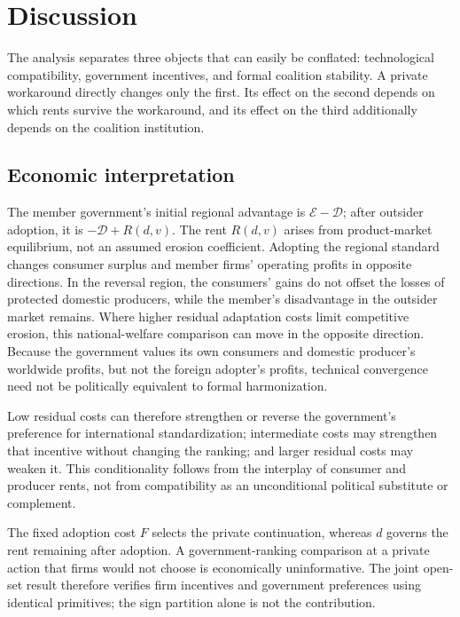\section{Discussion}
\label{sec:discussion}

The analysis separates three objects that can easily be conflated: technological compatibility, government incentives, and formal coalition stability. A private workaround directly changes only the first. Its effect on the second depends on which rents survive the workaround, and its effect on the third additionally depends on the coalition institution.

\subsection{Economic interpretation}
\label{subsec:discussion-interpretation}

The member government's initial regional advantage is $\mathscr E-\mathscr D$; after outsider adoption, it is $-\mathscr D+R(d,v)$. The rent $R(d,v)$ arises from product-market equilibrium, not an assumed erosion coefficient. Adopting the regional standard changes consumer surplus and member firms' operating profits in opposite directions. In the reversal region, the consumers' gains do not offset the losses of protected domestic producers, while the member's disadvantage in the outsider market remains. Where higher residual adaptation costs limit competitive erosion, this national-welfare comparison can move in the opposite direction. Because the government values its own consumers and domestic producer's worldwide profits, but not the foreign adopter's profits, technical convergence need not be politically equivalent to formal harmonization.

Low residual costs can therefore strengthen or reverse the government's preference for international standardization; intermediate costs may strengthen that incentive without changing the ranking; and larger residual costs may weaken it. This conditionality follows from the interplay of consumer and producer rents, not from compatibility as an unconditional political substitute or complement.

The fixed adoption cost $F$ selects the private continuation, whereas $d$ governs the rent remaining after adoption. A government-ranking comparison at a private action that firms would not choose is economically uninformative. The joint open-set result therefore verifies firm incentives and government preferences using identical primitives; the sign partition alone is not the contribution.

